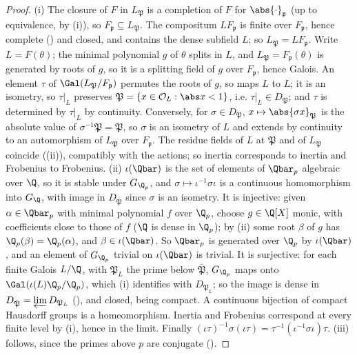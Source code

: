 \begin{proof}
(i) The closure of $F$ in $L_{\mathfrak P}$ is a completion of $F$ for $\abs{\cdot}_{\mathfrak p}$ (up to equivalence, by
(i)), so $F_{\mathfrak p}\subseteq L_{\mathfrak P}$. The compositum $LF_{\mathfrak p}$ is finite over $F_{\mathfrak p}$, hence
complete () and closed, and contains the dense subfield $L$; so $L_{\mathfrak P}=LF_{\mathfrak p}$. Write $L=F(\theta)$; the
minimal polynomial $g$ of $\theta$ splits in $L$, and $L_{\mathfrak P}=F_{\mathfrak p}(\theta)$ is generated by roots of $g$, so it is a splitting field of $g$
over $F_{\mathfrak p}$, hence Galois. An element $\tau$ of $\Gal(L_{\mathfrak P}/F_{\mathfrak p})$ permutes the roots of $g$, so maps $L$ to $L$; it is an isometry,
so $\tau|_L$ preserves $\mathfrak P=\{x\in\mathcal O_L:\abs x<1\}$, i.e. $\tau|_L\in D_{\mathfrak P}$; and $\tau$ is determined by $\tau|_L$ by continuity. Conversely,
for $\sigma\in D_{\mathfrak P}$, $x\mapsto\abs{\sigma x}_{\mathfrak P}$ is the absolute value of $\sigma^{-1}\mathfrak P=\mathfrak P$, so $\sigma$ is an isometry of $L$ and
extends by continuity to an automorphism of $L_{\mathfrak P}$ over $F_{\mathfrak p}$. The residue fields of $L$ at $\mathfrak P$ and of $L_{\mathfrak P}$ coincide
((ii)), compatibly with the actions; so inertia corresponds to inertia and Frobenius to Frobenius.
(ii) $\iota(\Qbar)$ is the set of elements of $\Qbar_p$ algebraic over $\Q$, so it is stable under $G_{\Q_p}$, and $\sigma\mapsto\iota^{-1}\sigma\iota$ is a
continuous homomorphism into $G_\Q$, with image in $D_{\bar{\mathfrak P}}$ since $\sigma$ is an isometry. It is injective: given $\alpha\in\Qbar_p$ with
minimal polynomial $f$ over $\Q_p$, choose $g\in\Q[X]$ monic, with coefficients close to those of $f$ ($\Q$ is dense in $\Q_p$); by
(ii) some root $\beta$ of $g$ has $\Q_p(\beta)=\Q_p(\alpha)$, and $\beta\in\iota(\Qbar)$. So $\Qbar_p$ is generated over $\Q_p$ by
$\iota(\Qbar)$, and an element of $G_{\Q_p}$ trivial on $\iota(\Qbar)$ is trivial. It is surjective: for each finite Galois $L/\Q$, with $\mathfrak P_L$ the
prime below $\bar{\mathfrak P}$, $G_{\Q_p}$ maps onto $\Gal(\iota(L)\Q_p/\Q_p)$, which (i) identifies with $D_{\mathfrak P_L}$; so the image is dense in
$D_{\bar{\mathfrak P}}=\varprojlim D_{\mathfrak P_L}$ (), and closed, being compact. A continuous bijection of compact Hausdorff groups is a
homeomorphism. Inertia and Frobenius correspond at every finite level by (i), hence in the limit. Finally $(\iota\tau)^{-1}\sigma(\iota\tau)=
\tau^{-1}(\iota^{-1}\sigma\iota)\tau$. (iii) follows, since the primes above $p$ are conjugate ().
\end{proof}

